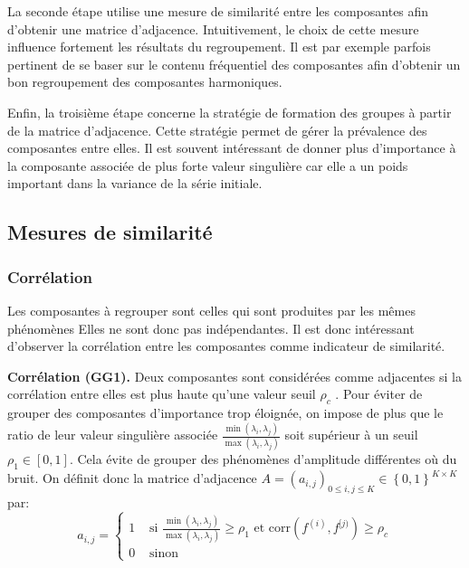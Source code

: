 \documentclass{gretsi}
\newcommand{\inter}{\left[0, 1\right]}
\begin{document}
La seconde étape utilise une mesure de similarité entre les composantes afin d'obtenir une matrice d'adjacence. Intuitivement, le choix de cette mesure influence fortement les résultats du regroupement.
Il est par exemple parfois pertinent de se  baser sur le contenu fréquentiel des composantes afin d'obtenir un bon regroupement des composantes harmoniques.

Enfin, la troisième étape concerne la stratégie de formation des groupes à partir de la matrice d'adjacence. Cette stratégie permet de gérer la prévalence des composantes entre elles.
Il est souvent intéressant de donner plus d'importance à la composante associée de plus forte valeur singulière car elle a un poids important dans la variance de la série initiale.


\subsection{Mesures de similarité}
\label{sub:sim}

\subsubsection{Corrélation}\label{ssub:cor}

Les composantes à regrouper sont celles qui sont produites par les mêmes phénomènes
Elles ne sont donc pas indépendantes.
Il est donc intéressant d'observer la corrélation entre les composantes comme indicateur de similarité.

\textbf{Corrélation (GG1).}\label{par:GG1}
    Deux composantes sont considérées comme adjacentes si la corrélation entre elles est plus haute qu'une valeur seuil $\rho_c$ \cite{abalov_14_auto}.
    Pour éviter de grouper des composantes d'importance trop éloignée, on impose de plus que le ratio de leur valeur singulière associée $\frac{\min(\lambda_i, \lambda_j)}{\max(\lambda_i, \lambda_j)}$ soit supérieur à un seuil $\rho_1 \in \inter$.
    Cela évite de grouper des phénomènes d'amplitude différentes où du bruit.
    On définit donc la matrice d'adjacence $A = (a_{i, j})_{0 \le i,j\le K} \in \left \{ 0, 1 \right \}^{K\times K}$ par:
    \begin{equation}
        a_{i, j} = \begin{cases}
	        1 &\text{ si } \displaystyle\frac{\min(\lambda_i, \lambda_j)}{\max(\lambda_i, \lambda_j)} \ge \rho_1 \text{ et } \text{corr}(f^{(i)}, f^{[j)}) \ge \rho_c\\
	        0& \text{ sinon}
        \end{cases}
    \end{equation}
\end{document}
